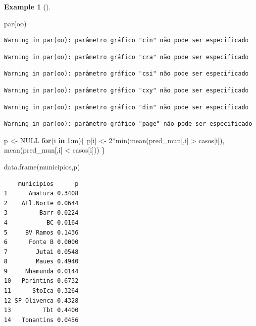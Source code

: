 \documentclass[
  letterpaper,
  DIV=11,
  numbers=noendperiod]{scrreprt}
\newenvironment{Shaded}{\begin{snugshade}}{\end{snugshade}}
\newcommand{\ConstantTok}[1]{\textcolor[rgb]{0.56,0.35,0.01}{#1}}
\newcommand{\ControlFlowTok}[1]{\textcolor[rgb]{0.00,0.23,0.31}{\textbf{#1}}}
\newcommand{\DecValTok}[1]{\textcolor[rgb]{0.68,0.00,0.00}{#1}}
\newcommand{\FunctionTok}[1]{\textcolor[rgb]{0.28,0.35,0.67}{#1}}
\newcommand{\NormalTok}[1]{\textcolor[rgb]{0.00,0.23,0.31}{#1}}
\newcommand{\OtherTok}[1]{\textcolor[rgb]{0.00,0.23,0.31}{#1}}
\newcommand{\SpecialCharTok}[1]{\textcolor[rgb]{0.37,0.37,0.37}{#1}}
\theoremstyle{definition}
\theoremstyle{plain}
\theoremstyle{definition}
\newtheorem{example}{Example}[chapter]
\theoremstyle{remark}
\begin{document}
\begin{example}[]
\begin{Shaded}
\begin{Highlighting}[]
\FunctionTok{par}\NormalTok{(oo)}
\end{Highlighting}
\end{Shaded}

\begin{verbatim}
Warning in par(oo): parâmetro gráfico "cin" não pode ser especificado
\end{verbatim}

\begin{verbatim}
Warning in par(oo): parâmetro gráfico "cra" não pode ser especificado
\end{verbatim}

\begin{verbatim}
Warning in par(oo): parâmetro gráfico "csi" não pode ser especificado
\end{verbatim}

\begin{verbatim}
Warning in par(oo): parâmetro gráfico "cxy" não pode ser especificado
\end{verbatim}

\begin{verbatim}
Warning in par(oo): parâmetro gráfico "din" não pode ser especificado
\end{verbatim}

\begin{verbatim}
Warning in par(oo): parâmetro gráfico "page" não pode ser especificado
\end{verbatim}

\begin{Shaded}
\begin{Highlighting}[]
\NormalTok{p }\OtherTok{\textless{}{-}} \ConstantTok{NULL}
\ControlFlowTok{for}\NormalTok{(i }\ControlFlowTok{in} \DecValTok{1}\SpecialCharTok{:}\NormalTok{m)\{}
\NormalTok{p[i] }\OtherTok{\textless{}{-}} \DecValTok{2}\SpecialCharTok{*}\FunctionTok{min}\NormalTok{(}\FunctionTok{mean}\NormalTok{(pred\_mun[,i] }\SpecialCharTok{\textgreater{}}\NormalTok{ casos[i]),}
\FunctionTok{mean}\NormalTok{(pred\_mun[,i] }\SpecialCharTok{\textless{}}\NormalTok{ casos[i]))}
\NormalTok{\}}

\FunctionTok{data.frame}\NormalTok{(municipios,p)}
\end{Highlighting}
\end{Shaded}

\begin{verbatim}
    municipios      p
1      Amatura 0.3408
2    Atl.Norte 0.0644
3         Barr 0.0224
4           BC 0.0164
5     BV Ramos 0.1436
6      Fonte B 0.0000
7        Jutai 0.0548
8        Maues 0.4940
9     Nhamunda 0.0144
10   Parintins 0.6732
11      StoIca 0.3264
12 SP Olivenca 0.4328
13         Tbt 0.4400
14   Tonantins 0.0456
\end{verbatim}


\end{example}
\end{document}
